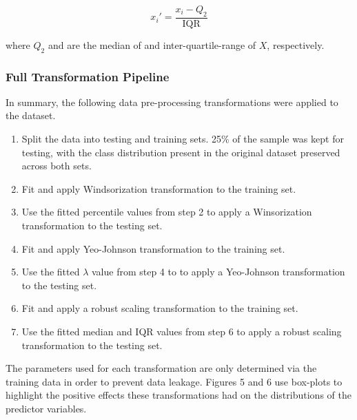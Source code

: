 \documentclass[11pt, oneside]{article}   	%
\begin{document}
\begin{equation}
	x_i' = \frac{x_i - Q_2}{\text{IQR}}
\end{equation}

\noindent where $Q_2 $ and  are the median of and inter-quartile-range of $X$, respectively.




\subsubsection{Full Transformation Pipeline}

In summary, the following data pre-processing transformations were applied to the dataset.

\begin{enumerate}
	\item Split the data into testing and training sets. 25\% of the sample was kept for testing, with the class distribution present in the original dataset preserved across both sets.
	\item Fit and apply Windsorization transformation to the training set.
	\item Use the fitted percentile values from step 2 to apply a Winsorization transformation to the testing set.
	\item Fit and apply Yeo-Johnson transformation to the training set.
	\item Use the fitted $\lambda$ value from step 4 to to apply a Yeo-Johnson transformation to the testing set.
	\item Fit and apply a robust scaling transformation to the training set.
	\item Use the fitted median and IQR values from step 6 to apply a robust scaling transformation to the testing set.
\end{enumerate}

The parameters used for each transformation are only determined via the training data in order to prevent data leakage. Figures 5 and 6 use box-plots to highlight the positive effects these transformations had on the distributions of the predictor variables. 
\end{document}
